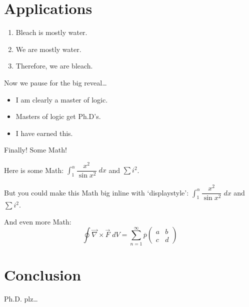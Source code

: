 \documentclass{beamer}	%
\newcommand{\ds}{\displaystyle}
\newcommand{\ov}[1]{\overline{#1}}
\newcommand{\twomatrix}[4]{\begin{pmatrix} #1 & #2 \\ #3 & #4 \end{pmatrix}}
\theoremstyle{plain}
\theoremstyle{definition}
\theoremstyle{remark}
\numberwithin{equation}{section}
\begin{document}
\section{Applications}



\begin{frame}
	\begin{enumerate}[1.]
	\item Bleach is mostly water. \pause
	\item We are mostly water. \pause
	\item Therefore, we are bleach.
	\end{enumerate} \vspace{0.5cm}

Now we pause for the big reveal\dots \pause \vspace{0.3cm}

	\begin{itemize}
	\item I am clearly a master of logic.
	\item Masters of logic get Ph.D's.
	\item I have earned this.
	\end{itemize}
\end{frame}



\begin{frame}
Finally! Some Math! \vspace{1cm}

Here is some Math: $\int_1^\alpha \dfrac{x^2}{\sin x^2} \;dx$ and $\sum i^2$. \vspace{1cm}

But you could make this Math big inline with `displaystyle': $\ds \int_1^\alpha \dfrac{x^2}{\sin x^2} \;dx$ and $\ds \sum i^2$. \vspace{1cm}

And even more Math:
	\[
	\oint \vec{\nabla} \times \vec{F} \;dV = \sum_{n=1}^\infty \ov{p} \twomatrix{a}{b}{c}{d}
	\]
\end{frame}



\section{Conclusion}



\begin{frame}
Ph.D. plz\dots
\end{frame}
\end{document}
